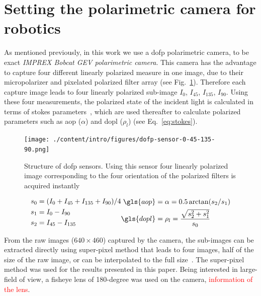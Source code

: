 \graphicspath{{./content/intro/figures/}}

\section{Setting the polarimetric camera for robotics}
\label{sec:rosify}
As mentioned previously, in this work we use a \gls{dofp} polarimetric camera,
to be exact \textit{IMPREX Bobcat GEV polarimetric camera}.
This camera has the advantage to capture four different linearly polarized
measure in one image, due to their micropolarizer and pixelated polarized
filter array (see Fig.~\ref{fig:dofp-sensor}).
Therefore each capture image leads to four linearly polarized sub-image $I_0$,
$I_{45}$, $I_{135}$, $I_{90}$.
Using these four measurements, the polarized state of the incident light is
calculated in terms of stokes parameters~\cite{goldstein2017polarized}, which
are used thereafter to calculate polarized parameters such as \gls{aop} ($\alpha$) and
\gls{dopl} ($\rho_l$) (see Eq.~\ref{eq:stokes}).

\begin{figure}
  \centering
  \texttt{[image: ./content/intro/figures/dofp-sensor-0-45-135-90.png]}
  \label{fig:dofp-sensor}
  \caption{Structure of \gls{dofp} sensors. Using this sensor four linearly
    polarized image corresponding to the four orientation of the polarized
    filters is acquired instantly}
\end{figure}


\begin{subequations}
  \begin{align}
    \label{eq:stokes1}
    s_0 & = (I_0 + I_{45} + I_{135} + I_{90})/4\\ \nonumber
    s_1 & = I_0 - I_{90} \\ \nonumber
    s_2 & = I_{45} - I_{135} \nonumber
  \end{align}
  \begin{align}
    \label{eq:stokes2}
    \gls{aop} & = \alpha = 0.5 \arctan(s_2/s_1) \\ \nonumber
    \gls{dopl} & = \rho_l = \frac{\sqrt{s_2^{2} + s_1^{2}}}{s_0} \nonumber
  \end{align}
  \label{eq:stokes}
\end{subequations}

From the raw images ($640\times460$) captured by the camera, the sub-images can
be extracted directly using super-pixel method that leads to four images, half
of the size of the raw image, or can be interpolated to the full
size~\cite{ratliff2009interpolationmicrogrid,gao2011bilinearpolarimeters}.  The
super-pixel method was used for the results presented in this paper. Being
interested in large-field of view, a fisheye lens of 180-degree was used on the
camera, \textcolor{red}{information of the lens}.

